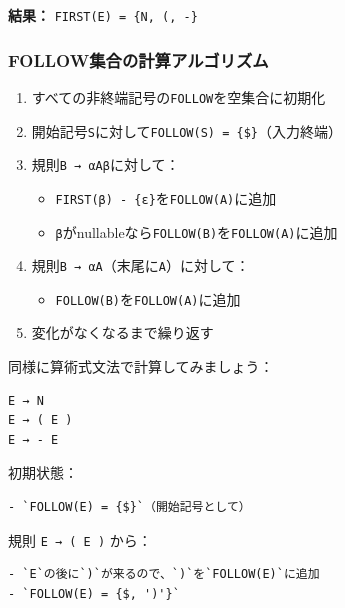 \textbf{結果：}
\texttt{FIRST(E)\ =\ \{N,\ \textquotesingle{}(\textquotesingle{},\ \textquotesingle{}-\textquotesingle{}\}}

\hypertarget{chapter5-followux96c6ux5408ux306eux8a08ux7b97ux30a2ux30ebux30b4ux30eaux30baux30e0}{%
\subsubsection{FOLLOW集合の計算アルゴリズム}\label{chapter5-followux96c6ux5408ux306eux8a08ux7b97ux30a2ux30ebux30b4ux30eaux30baux30e0}}

\begin{enumerate}
\def\labelenumi{\arabic{enumi}.}
\tightlist
\item
  すべての非終端記号の\texttt{FOLLOW}を空集合に初期化
\item
  開始記号\texttt{S}に対して\texttt{FOLLOW(S)\ =\ \{\$\}}（入力終端）
\item
  規則\texttt{B\ →\ αAβ}に対して：

  \begin{itemize}
  \tightlist
  \item
    \texttt{FIRST(β)\ -\ \{ε\}}を\texttt{FOLLOW(A)}に追加
  \item
    \texttt{β}がnullableなら\texttt{FOLLOW(B)}を\texttt{FOLLOW(A)}に追加
  \end{itemize}
\item
  規則\texttt{B\ →\ αA}（末尾に\texttt{A}）に対して：

  \begin{itemize}
  \tightlist
  \item
    \texttt{FOLLOW(B)}を\texttt{FOLLOW(A)}に追加
  \end{itemize}
\item
  変化がなくなるまで繰り返す
\end{enumerate}

同様に算術式文法で計算してみましょう：

\begin{verbatim}
E → N
E → ( E )
E → - E
\end{verbatim}

初期状態：

\begin{verbatim}
- `FOLLOW(E) = {$}`（開始記号として）
\end{verbatim}

規則 \texttt{E\ →\ (\ E\ )} から：

\begin{verbatim}
- `E`の後に`)`が来るので、`)`を`FOLLOW(E)`に追加
- `FOLLOW(E) = {$, ')'}`
\end{verbatim}

